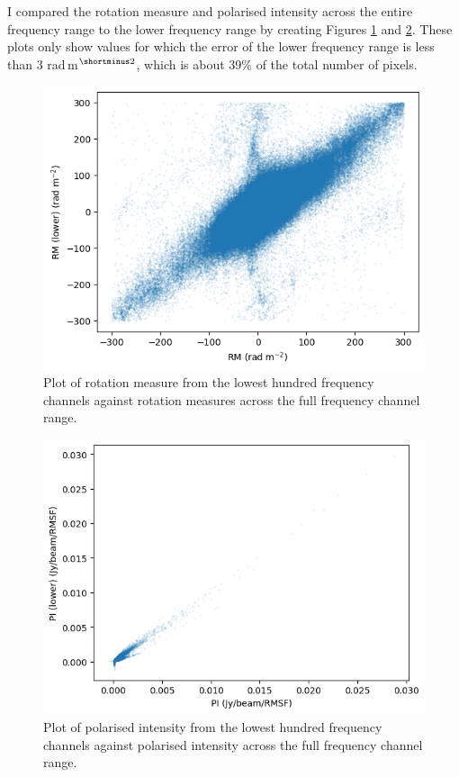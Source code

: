 I compared the rotation measure and polarised intensity across the entire frequency range to the lower frequency range by creating Figures \ref{fig: rm vs lower} and \ref{fig: pi vs lower}. These plots only show values for which the error of the lower frequency range is less than 3 rad$\,$m$^{\shortminus2}$, which is about 39$\%$ of the total number of pixels.

\begin{figure}
    \centering
    \includegraphics[width=1\linewidth]{Thesis_Template/Figures/RM_vs_lower_corr.png}
    \caption[Lower frequency RMs vs full frequency RMs]{Plot of rotation measure from the lowest hundred frequency channels against rotation measures across the full frequency channel range.}
    \label{fig: rm vs lower}
\end{figure}

\begin{figure}
    \centering
    \includegraphics[width=1\linewidth]{Thesis_Template/Figures/PI_vs_lower_corr.png}
    \caption[Lower frequency PI vs full frequency PI]{Plot of polarised intensity from the lowest hundred frequency channels against polarised intensity across the full frequency channel range.}
    \label{fig: pi vs lower}
\end{figure}

